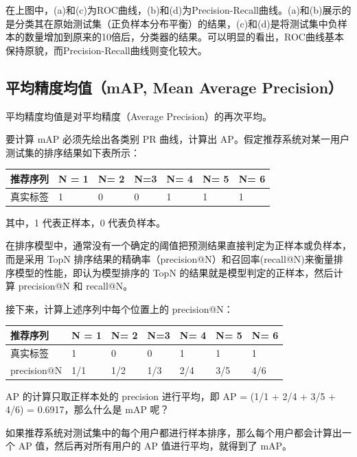 \documentclass[12pt]{article}
\begin{document}
在上图中，(a)和(c)为ROC曲线，(b)和(d)为Precision-Recall曲线。(a)和(b)展示的是分类其在原始测试集（正负样本分布平衡）的结果，(c)和(d)是将测试集中负样本的数量增加到原来的10倍后，分类器的结果。可以明显的看出，ROC曲线基本保持原貌，而Precision-Recall曲线则变化较大。

\subsection{平均精度均值（mAP, Mean Average Precision）}
平均精度均值是对平均精度（Average Precision）的再次平均。

要计算 mAP 必须先绘出各类别 PR 曲线，计算出 AP。假定推荐系统对某一用户测试集的排序结果如下表所示：
\begin{table}[h]
\begin{center}  
\begin{tabular}{|l|l|l|l|l|l|l|}  
\hline  
 推荐序列 & N = 1 & N= 2 & N=3 & N= 4 & N= 5 & N= 6 \\ \hline  
 真实标签 & 1 & 0 & 0 & 1 & 1 & 1 \\  \hline
\end{tabular}  
\end{center}
\end{table}

其中，1 代表正样本，0 代表负样本。

在排序模型中，通常没有一个确定的阈值把预测结果直接判定为正样本或负样本，而是采用 TopN 排序结果的精确率（precision@N）和召回率(recall@N)来衡量排序模型的性能，即认为模型排序的 TopN 的结果就是模型判定的正样本，然后计算 precision@N 和 recall@N。

接下来，计算上述序列中每个位置上的 precision@N：
\begin{table}[h]
\begin{center}  
\begin{tabular}{|l|l|l|l|l|l|l|}  
\hline  
 推荐序列 & N = 1 & N= 2 & N=3 & N= 4 & N= 5 & N= 6 \\ \hline  
 真实标签 & 1 & 0 & 0 & 1 & 1 & 1 \\  \hline
 precision@N & 1/1 & 1/2 & 1/3 & 2/4 & 3/5 & 4/6 \\  \hline
\end{tabular}  
\end{center}
\end{table}

AP 的计算只取正样本处的 precision 进行平均，即 AP = (1/1 + 2/4 + 3/5 + 4/6) = 0.6917，那么什么是 mAP 呢？

如果推荐系统对测试集中的每个用户都进行样本排序，那么每个用户都会计算出一个 AP 值，然后再对所有用户的 AP 值进行平均，就得到了 mAP。
\end{document}
